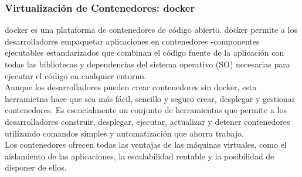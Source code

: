 \documentclass[../../main.tex]{subfiles}
\begin{document}
    
\begin{comment}
    \begin{itemize}
        \item R: Lenguaje de programación bajo el cual esta escrito el proyecto.
        \item RStudio: Entorno de desarollo de R
        \item Overleaf: Herramienta online para la escritura de la memoria.
        \item MariaDB: Servidor de base de datos.
        \item phpMyAdmin: Gestor de servidor de base de datos
        \item Docker: Gestor de maquinas virtuales
    \end{itemize}
    
    Se utilizará \Gls{docker} como gestor de maquinas virtuales esta herramienta para descargar una maquina virtual de un servidor de base de datos \gls{mariadb}\cite{doc11} y un gestor de base de datos \gls{phpmyadmin}\cite{doc12} ya preconfigurada.\\
\end{comment}

\subsubsection{Virtualización de Contenedores: \Gls{docker}}

\Gls{docker}\cite{doc10} es una plataforma de contenedores de código abierto. \Gls{docker} permite a los desarrolladores empaquetar aplicaciones en contenedores -componentes ejecutables estandarizados que combinan el código fuente de la aplicación con todas las bibliotecas y dependencias del sistema operativo (SO) necesarias para ejecutar el código en cualquier entorno.  \\

Aunque los desarrolladores pueden crear contenedores sin \Gls{docker}, esta herramietna hace que sea más fácil, sencillo y seguro crear, desplegar y gestionar contenedores. Es esencialmente un conjunto de herramientas que permite a los desarrolladores construir, desplegar, ejecutar, actualizar y detener contenedores utilizando comandos simples y automatización que ahorra trabajo.\\

Los contenedores ofrecen todas las ventajas de las máquinas virtuales, como el aislamiento de las aplicaciones, la escalabilidad rentable y la posibilidad de disponer de ellos.  \\
\end{document}
